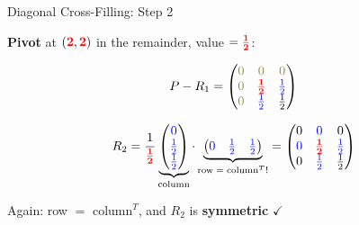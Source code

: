 \documentclass[10pt]{beamer}
\theoremstyle{definition}
\newcommand{\x}[1]{\alert{\textbf{#1}}}
\newcommand{\pvt}[1]{{\color{red}\mathbf{#1}}}       %
\newcommand{\crs}[1]{{\color{blue}#1}}                %
\newcommand{\ghost}[1]{{\color{yellow!50!black}#1}}   %
\begin{document}
\begin{frame}{Diagonal Cross-Filling: Step 2}

\x{Pivot} at $(\pvt{2},\pvt{2})$ in the remainder, value $= \pvt{\frac{1}{2}}$:

$$P - R_1 = \begin{pmatrix} \ghost{0} & \ghost{0} & \ghost{0} \\ \ghost{0} & \pvt{\frac{1}{2}} & \crs{\frac{1}{2}} \\ \ghost{0} & \crs{\frac{1}{2}} & \frac{1}{2} \end{pmatrix}$$

$$R_2 = \frac{1}{\pvt{\frac{1}{2}}} \underbrace{\begin{pmatrix} \crs{0} \\ \crs{\frac{1}{2}} \\ \crs{\frac{1}{2}} \end{pmatrix}}_{\text{column}} \cdot \underbrace{\begin{pmatrix} \crs{0} & \crs{\frac{1}{2}} & \crs{\frac{1}{2}} \end{pmatrix}}_{\text{row} \;=\; \text{column}^T!} = \begin{pmatrix} 0 & \crs{0} & 0 \\ \crs{0} & \pvt{\frac{1}{2}} & \crs{\frac{1}{2}} \\ 0 & \crs{\frac{1}{2}} & \frac{1}{2} \end{pmatrix}$$

Again: row $=$ column$^T$, and $R_2$ is \x{symmetric} $\checkmark$

\end{frame}
\end{document}
